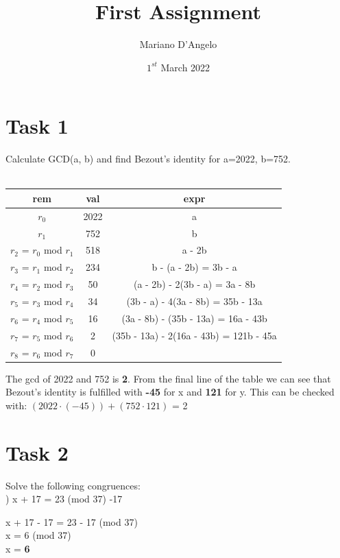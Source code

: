 \documentclass[12pt]{article}
\title{First Assignment}
\author{Mariano D'Angelo}
\date{$1^{st}$ March 2022}
\begin{document}
\maketitle


\section*{Task 1}
Calculate GCD(a, b) and find Bezout's identity for a=2022, b=752. \\\\
\begin{tabular}{ | c | c | c | } \hline
    \textbf{rem} & \textbf{val} & \textbf{expr} \\ \hline
    $r_0$ & 2022 & a \\
    $r_1$ & 752 & b \\
    $r_2$ = $r_0$ mod $r_1$ & 518 & a - 2b \\
    $r_3$ = $r_1$ mod $r_2$ & 234 & b - (a - 2b) = 3b - a \\
    $r_4$ = $r_2$ mod $r_3$ & 50 & (a - 2b) - 2(3b - a) = 3a - 8b \\
    $r_5$ = $r_3$ mod $r_4$ & 34 & (3b - a) - 4(3a - 8b) = 35b - 13a \\
    $r_6$ = $r_4$ mod $r_5$ & 16 & (3a - 8b) - (35b - 13a) = 16a - 43b \\
    $r_7$ = $r_5$ mod $r_6$ & 2 & (35b - 13a) - 2(16a - 43b) = 121b - 45a \\ \hline
    $r_8$ = $r_6$ mod $r_7$ & 0 & \\ \hline
\end{tabular}

\noindent \newline \newline The gcd of 2022 and 752 is \textbf{2}. \newline
From the final line of the table we can see that Bezout's identity is fulfilled
with \textbf{-45} for x and \textbf{121} for y.\newline
This can be checked with: $(2022 \cdot (-45)) + (752 \cdot 121)$ = 2

\pagebreak


\section*{Task 2} 

Solve the following congruences: \\

) x + 17 = 23 (mod 37) \textbar{} -17
\begin{addmargin}[1.22em]{0em}
x + 17 - 17 = 23 - 17 (mod 37) \\
x = 6 (mod 37) \\
x = \textbf{6} \\
\end{addmargin}
\end{document}
